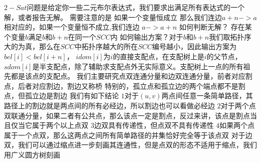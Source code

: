 {}\markdownRendererSectionBegin
{}\markdownRendererInterblockSeparator
{}\markdownRendererInterblockSeparator
{}
\markdownRendererSectionEnd \markdownRendererSectionBegin
{}\markdownRendererInterblockSeparator
{}$ 2-Sat $问题是给定你一些二元布尔表达式，我们要求出满足所有表达式的一个解，或者报告无解。\markdownRendererParagraphSeparator
{}需要注意的是 如果一个变量恒成立 那么我们连边$ a+n->a $\markdownRendererParagraphSeparator
{}相对应的，如果一个变量恒不成立,我们连边 $ a->a+n $\markdownRendererParagraphSeparator
{}如何判断无解？ 存在某个变量$ b $满足$ b $和$ b+n $在同一个$ SCC $内\markdownRendererParagraphSeparator
{}如何输出方案？对于$ b $和$ b+n $我们取拓扑序大的为真，那么在$ SCC $中拓扑序越大的所在$ SCC $编号越小，因此输出方案为$ bel[i]<bel[i+n] $，\markdownRendererInterblockSeparator
{}
\markdownRendererSectionEnd \markdownRendererSectionBegin
{}\markdownRendererInterblockSeparator
{}$ idom[i] $为$ i $的直接支配点，在支配树上是$ i $的父节点，$ sdom[i] $是半支配点，除了辅助求支配点外无实际意义。支配树上一点的所有祖先都是该点的支配点。\markdownRendererInterblockSeparator
{}\markdownRendererInterblockSeparator
{}
\markdownRendererSectionEnd 
\markdownRendererSectionEnd \markdownRendererSectionBegin
{}\markdownRendererInterblockSeparator
{}我们主要研究点双连通分量和边双连通分量，前者对应割点，后者对应割边，割边又称桥\markdownRendererParagraphSeparator
{}特别的，孤立点和孤立边的两个端点都不是割点，但孤立边是割边\markdownRendererParagraphSeparator
{}我们有如下结论\markdownRendererParagraphSeparator
{}$ 1 $对于$ (u,v) $两点间任意一条简单路径，其路径上的割边就是两点间的所有必经边，所以割边也可以看做必经边\markdownRendererParagraphSeparator
{}$ 2 $对于两个点双联通分量，如果二者有公共点，那么该点一定是割点，反过来讲，该点是割点当且仅当它属于两个以上点双\markdownRendererParagraphSeparator
{}$ 3 $边双具有传递性，但点双不具有传递性\markdownRendererParagraphSeparator
{}$ 4 $如果两个点属于一个点双，那么这两点之间所有简单路径的并集恰好完全等于该点双\markdownRendererParagraphSeparator
{}对于边双，我们可以通过缩点进一步刻画其连通性，但是点双的形态不适用于缩点，我们用广义圆方树刻画\markdownRendererInterblockSeparator
{}\markdownRendererSectionBegin
{}\markdownRendererInterblockSeparator
